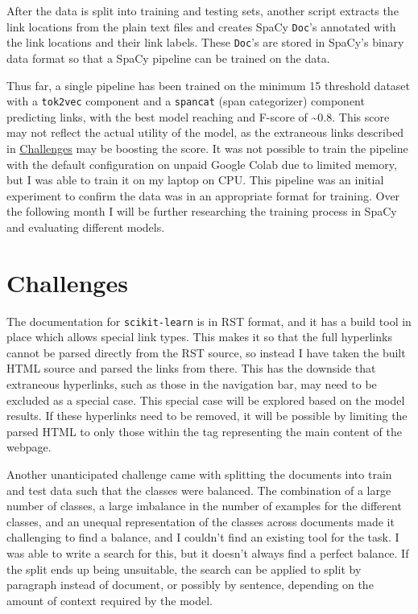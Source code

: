 \documentclass[manuscript,screen,review]{acmart}
\begin{document}
After the data is split into training and testing sets, another script
extracts the link locations from the plain text files and creates
SpaCy \texttt{Doc}'s annotated with the link locations and their link
labels. These \texttt{Doc}'s are stored in SpaCy's binary data format so that a
SpaCy pipeline can be trained on the data.

Thus far, a single pipeline has been trained on the minimum 15
threshold dataset with a \texttt{tok2vec} component and a \texttt{spancat} (span
categorizer) component predicting links, with the best model reaching
and F-score of \textasciitilde 0.8. This score may not reflect the
actual utility of the model, as the extraneous links described in
\hyperref[sec:orgd811032]{Challenges} may be boosting the score. It was not possible to train the
pipeline with the default configuration on unpaid Google Colab due to
limited memory, but I was able to train it on my laptop on CPU. This
pipeline was an initial experiment to confirm the data was in an
appropriate format for training. Over the following month I will be
further researching the training process in SpaCy and evaluating
different models.

\section*{Challenges}
\label{sec:orgd811032}

The documentation for \texttt{scikit-learn} is in RST format, and it has a
build tool in place which allows special link types. This makes it so
that the full hyperlinks cannot be parsed directly from the RST
source, so instead I have taken the built HTML source and parsed the
links from there. This has the downside that extraneous hyperlinks,
such as those in the navigation bar, may need to be excluded as a
special case. This special case will be explored based on the model
results. If these hyperlinks need to be removed, it will be possible
by limiting the parsed HTML to only those within the tag representing
the main content of the webpage.

Another unanticipated challenge came with splitting the documents into
train and test data such that the classes were balanced. The
combination of a large number of classes, a large imbalance in the
number of examples for the different classes, and an unequal
representation of the classes across documents made it challenging to
find a balance, and I couldn't find an existing tool for the task. I
was able to write a search for this, but it doesn't always find a
perfect balance. If the split ends up being unsuitable, the search can
be applied to split by paragraph instead of document, or possibly by
sentence, depending on the amount of context required by the model.
\end{document}
